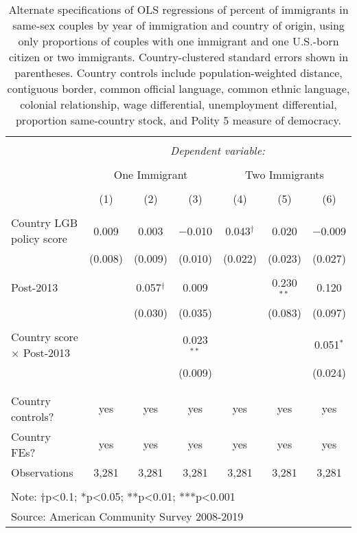 \documentclass[
  11pt,
]{article}
\begin{document}
\begin{table}[!htbp] \centering 
  \caption{Alternate specifications of OLS regressions of percent of immigrants in same-sex couples by year of immigration and country of origin, using only proportions of couples with one immigrant and one U.S.-born citizen or two immigrants. Country-clustered standard errors shown in parentheses. Country controls include population-weighted distance, contiguous border, common official language, common ethnic language, colonial relationship, wage differential, unemployment differential, proportion same-country stock, and Polity 5 measure of democracy.} 
  \label{tab:country-props-alt} 
\begin{tabular}{@{\extracolsep{5pt}}lcccccc} 
\\[-1.8ex]\hline 
\hline \\[-1.8ex] 
 & \multicolumn{6}{c}{\textit{Dependent variable:}} \\ 
\cline{2-7} 
\\[-1.8ex] & \multicolumn{3}{c}{One Immigrant} & \multicolumn{3}{c}{Two Immigrants} \\ 
\\[-1.8ex] & (1) & (2) & (3) & (4) & (5) & (6)\\ 
\hline \\[-1.8ex] 
 Country LGB policy score & 0.009 & 0.003 & $-$0.010 & 0.043$^{†}$ & 0.020 & $-$0.009 \\ 
  & (0.008) & (0.009) & (0.010) & (0.022) & (0.023) & (0.027) \\ 
  & & & & & & \\ 
 Post-2013 &  & 0.057$^{†}$ & 0.009 &  & 0.230$^{**}$ & 0.120 \\ 
  &  & (0.030) & (0.035) &  & (0.083) & (0.097) \\ 
  & & & & & & \\ 
 Country score × Post-2013 &  &  & 0.023$^{**}$ &  &  & 0.051$^{*}$ \\ 
  &  &  & (0.009) &  &  & (0.024) \\ 
  & & & & & & \\ 
\hline \\[-1.8ex] 
Country controls? & yes & yes & yes & yes & yes & yes \\ 
Country FEs? & yes & yes & yes & yes & yes & yes \\ 
Observations & 3,281 & 3,281 & 3,281 & 3,281 & 3,281 & 3,281 \\ 
\hline 
\hline \\[-1.8ex] 
\multicolumn{7}{l}{Note: †p<0.1; *p<0.05; **p<0.01; ***p<0.001} \\ 
\multicolumn{7}{l}{Source: American Community Survey 2008-2019} \\ 
\end{tabular} 
\end{table}
\end{document}
